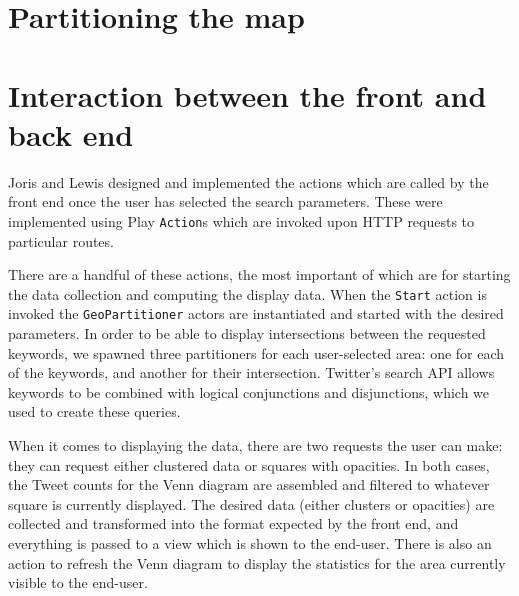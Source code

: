 \section{Partitioning the map}

\section{Interaction between the front and back end}

Joris and Lewis designed and implemented the actions which are called by the
front end once the user has selected the search parameters.  These were
implemented using Play \verb+Action+s which are invoked upon HTTP requests to
particular routes.

There are a handful of these actions, the most important of which are for
starting the data collection and computing the display data.  When the
\verb+Start+ action is invoked the \verb+GeoPartitioner+ actors are
instantiated and started with the desired parameters.  In order to be able to
display intersections between the requested keywords, we spawned three
partitioners for each user-selected area: one for each of the keywords, and
another for their intersection.  Twitter's search API allows keywords to be
combined with logical conjunctions and disjunctions, which we used to create
these queries.

When it comes to displaying the data, there are two requests the user can make:
they can request either clustered data or squares with opacities.  In both
cases, the Tweet counts for the Venn diagram are assembled and filtered to
whatever square is currently displayed.  The desired data (either clusters or
opacities) are collected and transformed into the format expected
by the front end, and everything is passed to a view which is shown to the
end-user.  There is also an action to refresh the Venn diagram to display the statistics for the area currently visible to the end-user.
